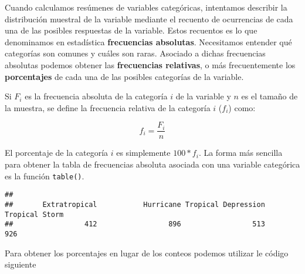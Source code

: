 \documentclass[
]{book}
\newenvironment{Shaded}{\begin{snugshade}}{\end{snugshade}}
\newcommand{\CommentTok}[1]{\textcolor[rgb]{0.56,0.35,0.01}{\textit{#1}}}
\newcommand{\DecValTok}[1]{\textcolor[rgb]{0.00,0.00,0.81}{#1}}
\newcommand{\FunctionTok}[1]{\textcolor[rgb]{0.00,0.00,0.00}{#1}}
\newcommand{\NormalTok}[1]{#1}
\newcommand{\OtherTok}[1]{\textcolor[rgb]{0.56,0.35,0.01}{#1}}
\newcommand{\SpecialCharTok}[1]{\textcolor[rgb]{0.00,0.00,0.00}{#1}}
\begin{document}
Cuando calculamos resúmenes de variables categóricas, intentamos describir la distribución muestral de la variable mediante el recuento de ocurrencias de cada una de las posibles respuestas de la variable. Estos recuentos es lo que denominamos en estadística \textbf{frecuencias absolutas}. Necesitamos entender qué categorías son comunes y cuáles son raras. Asociado a dichas frecuencias absolutas podemos obtener las \textbf{frecuencias relativas}, o más frecuentemente los \textbf{porcentajes} de cada una de las posibles categorías de la variable.

Si \(F_i\) es la frecuencia absoluta de la categoría \(i\) de la variable y \(n\) es el tamaño de la muestra, se define la frecuencia relativa de la categoría \(i\) (\(f_i\)) como:

\begin{equation} 
  f_i =\frac{F_i}{n}
  \label{eq:freqrel}
\end{equation}

El porcentaje de la categoría \(i\) es simplemente \(100 * f_i\). La forma más sencilla para obtener la tabla de frecuencias absoluta asociada con una variable categórica es la función \texttt{table()}.

\begin{Shaded}
\end{Shaded}

\begin{verbatim}
## 
##       Extratropical           Hurricane Tropical Depression      Tropical Storm 
##                 412                 896                 513                 926
\end{verbatim}

Para obtener los porcentajes en lugar de los conteos podemos utilizar le código siguiente

\begin{Shaded}
\end{Shaded}
\end{document}
